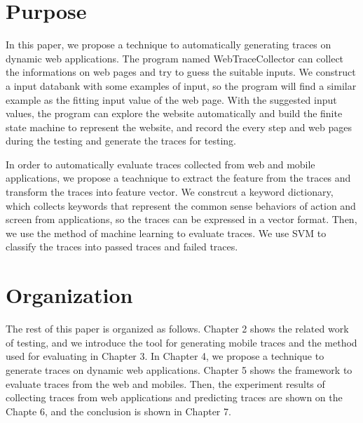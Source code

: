 

\section{Purpose}

In this paper, we propose a technique to automatically generating traces on dynamic web applications.
The program named WebTraceCollector can collect the informations on web pages and try to guess the suitable inputs.
We construct a input databank with some examples of input,
so the program will find a similar example as the fitting input value of the web page.
With the suggested input values,
the program can explore the website automatically and build the finite state machine to represent the website,
and record the every step and web pages during the testing and generate the traces for testing.

In order to automatically evaluate traces collected from web and mobile applications,
we propose a teachnique to extract the feature from the traces and transform the traces into feature vector.
We constrcut a keyword dictionary, 
which collects keywords that represent the common sense behaviors of action and screen from applications,
so the traces can be expressed in a vector format.
Then, we use the method of machine learning to evaluate traces.
We use SVM to classify the traces into passed traces and failed traces.




\clearpage

\section{Organization}

The rest of this paper is organized as follows.
Chapter 2 shows the related work of testing, 
and we introduce the tool for generating mobile traces and the method used for evaluating in Chapter 3.
In Chapter 4, we propose a technique to generate traces on dynamic web applications.
Chapter 5 shows the framework to evaluate traces from the web and mobiles.
Then, the experiment results of collecting traces from web applications and 
predicting traces are shown on the Chapte 6,
and the conclusion is shown in Chapter 7.


